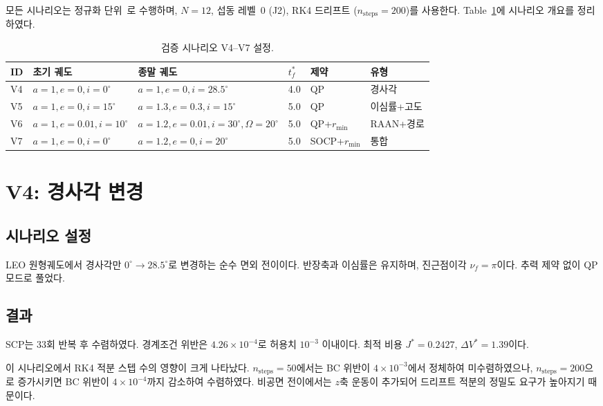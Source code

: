 \documentclass[11pt]{article}
\begin{document}
모든 시나리오는 정규화 단위~\cite{report001}로 수행하며,
$N=12$, 섭동 레벨~0 (J2), RK4 드리프트 ($n_{\mathrm{steps}}=200$)를 사용한다.
Table~\ref{tab:scenarios}에 시나리오 개요를 정리하였다.

\begin{table}[h]
\centering
\caption{검증 시나리오 V4--V7 설정.}
\label{tab:scenarios}
\begin{tabular}{llllll}
\toprule
ID & 초기 궤도 & 종말 궤도 & $t_f^*$ & 제약 & 유형 \\
\midrule
V4 & $a{=}1, e{=}0, i{=}0^\circ$ & $a{=}1, e{=}0, i{=}28.5^\circ$ & 4.0 & QP & 경사각 \\
V5 & $a{=}1, e{=}0, i{=}15^\circ$ & $a{=}1.3, e{=}0.3, i{=}15^\circ$ & 5.0 & QP & 이심률+고도 \\
V6 & $a{=}1, e{=}0.01, i{=}10^\circ$ & $a{=}1.2, e{=}0.01, i{=}30^\circ, \Omega{=}20^\circ$ & 5.0 & QP+$r_{\min}$ & RAAN+경로 \\
V7 & $a{=}1, e{=}0, i{=}0^\circ$ & $a{=}1.2, e{=}0, i{=}20^\circ$ & 5.0 & SOCP+$r_{\min}$ & 통합 \\
\bottomrule
\end{tabular}
\end{table}

\section{V4: 경사각 변경}

\subsection{시나리오 설정}

LEO 원형궤도에서 경사각만 $0^\circ \to 28.5^\circ$로 변경하는 순수 면외 전이이다.
반장축과 이심률은 유지하며, 진근점이각 $\nu_f = \pi$이다.
추력 제약 없이 QP 모드로 풀었다.

\subsection{결과}

SCP는 33회 반복 후 수렴하였다.
경계조건 위반은 $4.26 \times 10^{-4}$로 허용치 $10^{-3}$ 이내이다.
최적 비용 $J^* = 0.2427$, $\Delta V^* = 1.39$이다.

이 시나리오에서 RK4 적분 스텝 수의 영향이 크게 나타났다.
$n_{\mathrm{steps}} = 50$에서는 BC 위반이 $4 \times 10^{-3}$에서 정체하여
미수렴하였으나, $n_{\mathrm{steps}} = 200$으로 증가시키면
BC 위반이 $4 \times 10^{-4}$까지 감소하여 수렴하였다.
비공면 전이에서는 $z$축 운동이 추가되어
드리프트 적분의 정밀도 요구가 높아지기 때문이다.
\end{document}
